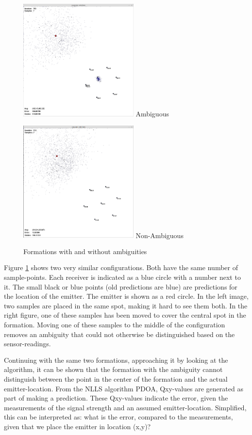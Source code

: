 \documentclass[10pt,a4paper]{book}
\begin{document}
\begin{figure}[H]
\centering
\begin{minipage}{60mm}
  \centering
  \includegraphics[width=60mm]{ambiguous.png}
  Ambiguous
\end{minipage}%
\begin{minipage}{60mm}
  \centering
  \includegraphics[width=60mm]{nonambiguous.png}
  Non-Ambiguous
\end{minipage}
\caption{Formations with and without ambiguities}
\label{ambiguity}
\end{figure}


Figure \ref{ambiguity} shows two very similar configurations. Both have the same number of sample-points. Each receiver is indicated as a blue circle with a number next to it. The small black or blue points (old predictions are blue) are predictions for the location of the emitter. The emitter is shown as a red circle. In the left image, two samples are placed in the same spot, making it hard to see them both. In the right figure, one of these samples has been moved to cover the central spot in the formation. Moving one of these samples to the middle of the configuration removes an ambiguity that could not otherwise be distinguished based on the sensor-readings. 

Continuing with the same two formations, approaching it by looking at the algorithm, it can be shown that the formation with the ambiguity cannot distinguish between the point in the center of the formation and the actual emitter-location. From the \gls{NLLS} algorithm \gls{PDOA}, Qxy-values are generated as part of making a prediction. These Qxy-values indicate the error, given the measurements of the signal strength and an assumed emitter-location. Simplified, this can be interpreted as: what is the error, compared to the measurements, given that we place the emitter in location (x,y)?
\end{document}
